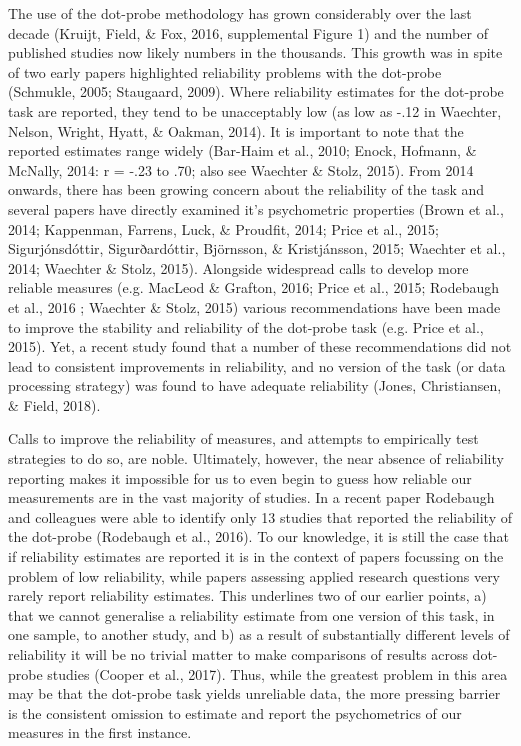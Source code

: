 \documentclass[english,,man,floatsintext]{apa6}
\begin{document}
The use of the dot-probe methodology has grown considerably over the last decade (Kruijt, Field, \& Fox, 2016, supplemental Figure 1) and the number of published studies now likely numbers in the thousands. This growth was in spite of two early papers highlighted reliability problems with the dot-probe (Schmukle, 2005; Staugaard, 2009). Where reliability estimates for the dot-probe task are reported, they tend to be unacceptably low (as low as -.12 in Waechter, Nelson, Wright, Hyatt, \& Oakman, 2014). It is important to note that the reported estimates range widely (Bar-Haim et al., 2010; Enock, Hofmann, \& McNally, 2014: r = -.23 to .70; also see Waechter \& Stolz, 2015). From 2014 onwards, there has been growing concern about the reliability of the task and several papers have directly examined it's psychometric properties (Brown et al., 2014; Kappenman, Farrens, Luck, \& Proudfit, 2014; Price et al., 2015; Sigurjónsdóttir, Sigurðardóttir, Björnsson, \& Kristjánsson, 2015; Waechter et al., 2014; Waechter \& Stolz, 2015). Alongside widespread calls to develop more reliable measures (e.g. MacLeod \& Grafton, 2016; Price et al., 2015; Rodebaugh et al., 2016 ; Waechter \& Stolz, 2015) various recommendations have been made to improve the stability and reliability of the dot-probe task (e.g. Price et al., 2015). Yet, a recent study found that a number of these recommendations did not lead to consistent improvements in reliability, and no version of the task (or data processing strategy) was found to have adequate reliability (Jones, Christiansen, \& Field, 2018).

Calls to improve the reliability of measures, and attempts to empirically test strategies to do so, are noble. Ultimately, however, the near absence of reliability reporting makes it impossible for us to even begin to guess how reliable our measurements are in the vast majority of studies. In a recent paper Rodebaugh and colleagues were able to identify only 13 studies that reported the reliability of the dot-probe (Rodebaugh et al., 2016). To our knowledge, it is still the case that if reliability estimates are reported it is in the context of papers focussing on the problem of low reliability, while papers assessing applied research questions very rarely report reliability estimates. This underlines two of our earlier points, a) that we cannot generalise a reliability estimate from one version of this task, in one sample, to another study, and b) as a result of substantially different levels of reliability it will be no trivial matter to make comparisons of results across dot-probe studies (Cooper et al., 2017). Thus, while the greatest problem in this area may be that the dot-probe task yields unreliable data, the more pressing barrier is the consistent omission to estimate and report the psychometrics of our measures in the first instance.
\end{document}
